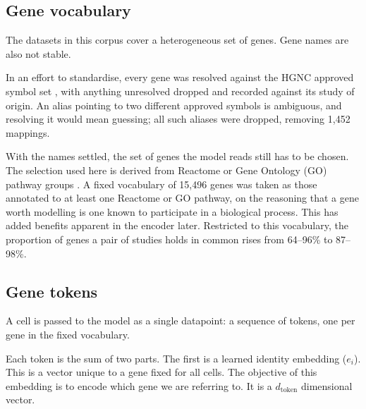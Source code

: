 

\subsection*{Gene vocabulary}

The datasets in this corpus cover a heterogeneous set of genes. Gene
names are also not stable.

In an effort to standardise, every gene was resolved against the HGNC 
approved symbol set \citep{seal2023genenames}, with anything unresolved dropped and recorded against 
its study of origin. An alias pointing to two different approved symbols 
is ambiguous, and resolving it would mean guessing; all such aliases were 
dropped, removing 1{,}452 mappings.

With the names settled, the set of genes the model reads still has to be
chosen. The selection used here is derived from Reactome or Gene Ontology
(GO) pathway groups \citep{gillespie2022reactome, go2023knowledgebase}.  A fixed vocabulary of 15{,}496 genes was taken as those 
annotated to at least one Reactome or GO pathway, on the reasoning that a
gene worth modelling is one known to participate in a biological process. 
This has added benefits apparent in the encoder later. Restricted to this 
vocabulary, the proportion of genes a pair of studies holds in common 
rises from 64–96\% to 87–98\%.



\subsection*{Gene tokens}

A cell is passed to the model as a single datapoint: a sequence of
tokens, one per gene in the fixed vocabulary.

Each token is the sum of two parts. The first is a learned identity
embedding ($e_i$). This is a vector unique to a gene fixed for all cells. 
The objective of this embedding is to encode which gene we are referring 
to. It is a $d_{\text{token}}$ dimensional vector.

